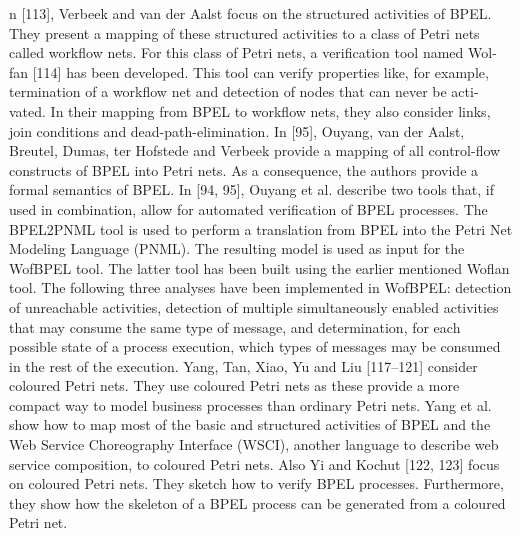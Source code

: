 n [113], Verbeek and van der Aalst focus on the structured activities of BPEL.
They present a mapping of these structured activities to a class of Petri nets
called workflow nets. For this class of Petri nets, a verification tool named Wol-
fan [114] has been developed. This tool can verify properties like, for example,
termination of a workflow net and detection of nodes that can never be acti-
vated. In their mapping from BPEL to workflow nets, they also consider links,
join conditions and dead-path-elimination.
In [95], Ouyang, van der Aalst, Breutel, Dumas, ter Hofstede and Verbeek
provide a mapping of all control-flow constructs of BPEL into Petri nets. As
a consequence, the authors provide a formal semantics of BPEL. In [94, 95],
Ouyang et al. describe two tools that, if used in combination, allow for automated
verification of BPEL processes. The BPEL2PNML tool is used to perform a
translation from BPEL into the Petri Net Modeling Language (PNML). The
resulting model is used as input for the WofBPEL tool. The latter tool has been
built using the earlier mentioned Woflan tool. The following three analyses have
been implemented in WofBPEL: detection of unreachable activities, detection
of multiple simultaneously enabled activities that may consume the same type
of message, and determination, for each possible state of a process execution,
which types of messages may be consumed in the rest of the execution.
Yang, Tan, Xiao, Yu and Liu [117–121] consider coloured Petri nets. They use
coloured Petri nets as these provide a more compact way to model business
processes than ordinary Petri nets. Yang et al. show how to map most of the basic
and structured activities of BPEL and the Web Service Choreography Interface
(WSCI), another language to describe web service composition, to coloured Petri
nets.
Also Yi and Kochut [122, 123] focus on coloured Petri nets. They sketch how
to verify BPEL processes. Furthermore, they show how the skeleton of a BPEL
process can be generated from a coloured Petri net.

